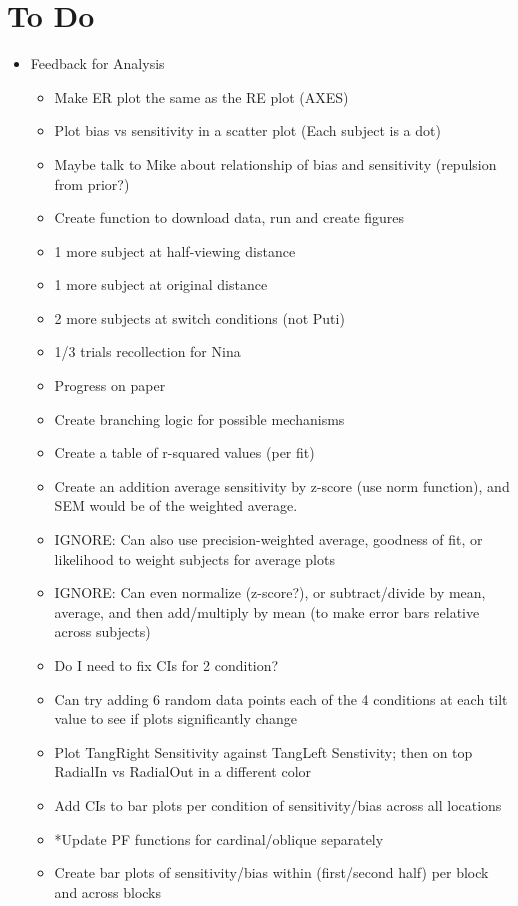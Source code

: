 \documentclass[11pt]{article} %
\begin{document}
\section{To Do} 
\begin{itemize}
\item Feedback for Analysis
	\begin{itemize}
	\item Make ER plot the same as the RE plot (AXES)
	\item Plot bias vs sensitivity in a scatter plot (Each subject is a dot)
	\item Maybe talk to Mike about relationship of bias and sensitivity (repulsion from prior?)
	\item Create function to download data, run and create figures
	\item 1 more subject at half-viewing distance
	\item 1 more subject at original distance
	\item 2 more subjects at switch conditions (not Puti)
	\item 1/3 trials recollection for Nina
	\item Progress on paper
	\item Create branching logic for possible mechanisms
	\item Create a table of r-squared values (per fit)
	\item Create an addition average sensitivity by z-score (use norm function), and SEM would be of the weighted average.
	\item IGNORE: Can also use precision-weighted average, goodness of fit, or likelihood to weight subjects for average plots
	\item IGNORE: Can even normalize (z-score?), or subtract/divide by mean, average, and then add/multiply by mean (to make error bars relative across subjects)
	\item Do I need to fix CIs for 2 condition?
	\item Can try adding 6 random data points each of the 4 conditions at each tilt value to see if plots significantly change
	\item Plot TangRight Sensitivity against TangLeft Senstivity; then on top RadialIn vs RadialOut in a different color
	\item Add CIs to bar plots per condition of sensitivity/bias across all locations
	\item *Update PF functions for cardinal/oblique separately
	\item Create bar plots of sensitivity/bias within (first/second half) per block and across blocks

\end{itemize}
\end{itemize}
\end{document}
